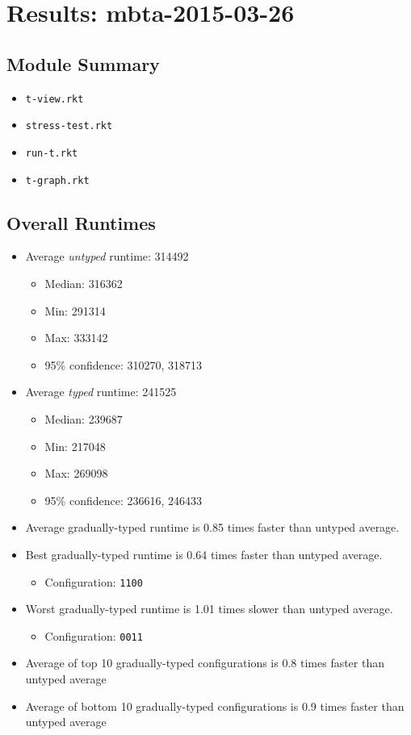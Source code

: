 \documentclass{article}
\newcommand{\mono}[1]{\texttt{#1}}
\begin{document}
\section{Results: mbta-2015-03-26}

\subsection{Module Summary}
\begin{itemize}
\item \mono{t-view.rkt}
\item \mono{stress-test.rkt}
\item \mono{run-t.rkt}
\item \mono{t-graph.rkt}\end{itemize}

\subsection{Overall Runtimes}
\begin{itemize}
\item Average \emph{untyped} runtime: 314492
  \begin{itemize}
  \item Median: 316362
  \item Min: 291314
  \item Max: 333142
  \item 95\% confidence: 310270, 318713
  \end{itemize}
\item Average \emph{typed} runtime: 241525
  \begin{itemize}
  \item Median: 239687
  \item Min: 217048
  \item Max: 269098
  \item 95\% confidence: 236616, 246433
  \end{itemize}
\item Average gradually-typed runtime is 0.85 times faster than untyped average.
\item Best gradually-typed runtime is 0.64 times faster than untyped average.
\begin{itemize}\item Configuration: \mono{1100}\end{itemize}
\item Worst gradually-typed runtime is 1.01 times slower than untyped average.
\begin{itemize}\item Configuration: \mono{0011}\end{itemize}
\item Average of top 10 gradually-typed configurations is 0.8 times faster than untyped average
\item Average of bottom 10 gradually-typed configurations is 0.9 times faster than untyped average
\end{itemize}
\end{document}
